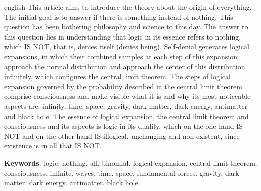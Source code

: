 \renewcommand{\resumoname}{Abstract}
\begin{resumoumacoluna}
 \begin{otherlanguage*}{english}
\vspace{-2mm}
	This article aims to introduce the theory about the origin of everything. The initial goal is to answer if there is something instead of nothing. This question has been bothering philosophy and science to this day. The answer to this question lies in understanding that logic in its essence refers to nothing, which IS NOT, that is, denies itself (denies being). Self-denial generates logical expansions, in which their combined samples at each step of this expansion approach the normal distribution and approach the center of this distribution infinitely, which configures the central limit theorem. The steps of logical expansion governed by the probability described in the central limit theorem comprise consciousness and make visible what it is and why its most noticeable aspects are: infinity, time, space, gravity, dark matter, dark energy, antimatter and black hole. The essence of logical expansion, the central limit theorem and consciousness and its aspects is logic in its duality, which on the one hand IS NOT and on the other hand IS illogical, unchanging and non-existent, since existence is in all that IS NOT.
	\vspace{\onelineskip} 
	\noindent
	
	\textbf{Keywords}: logic. nothing. all. binomial. logical expansion. central limit theorem. consciousness. infinite. waves. time. space. fundamental forces. gravity. dark matter. dark energy. antimatter. black hole.
 \end{otherlanguage*}  
\end{resumoumacoluna}
